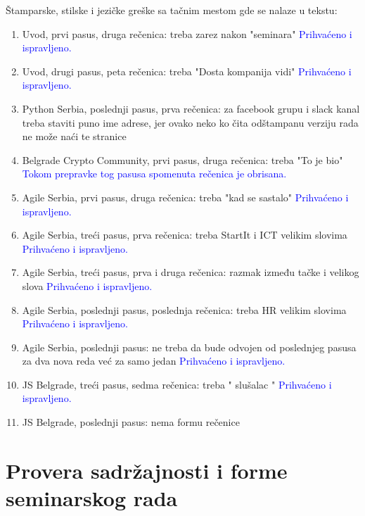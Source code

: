 \documentclass[a4paper]{report}
\newcommand{\odgovor}[1]{\textcolor{blue}{#1}}
\begin{document}
Štamparske, stilske i jezičke greške sa tačnim mestom gde se nalaze u tekstu:
\begin{enumerate}
\item Uvod, prvi pasus, druga rečenica: treba zarez nakon "{seminara}"
\odgovor{Prihvaćeno i ispravljeno.}
\item Uvod, drugi pasus, peta rečenica: treba "{Dosta kompanija vidi}"
\odgovor{Prihvaćeno i ispravljeno.}
\item Python Serbia, poslednji pasus, prva rečenica: za facebook grupu i slack kanal treba staviti puno ime adrese, jer ovako neko ko čita odštampanu verziju rada ne može naći te stranice
\item Belgrade Crypto Community, prvi pasus, druga rečenica: treba "To je bio"
\odgovor{Tokom prepravke tog pasusa spomenuta rečenica je obrisana.}
\item Agile Serbia, prvi pasus, druga rečenica: treba "kad se sastalo"
\odgovor{Prihvaćeno i ispravljeno.}
\item Agile Serbia, treći pasus, prva rečenica: treba StartIt i ICT velikim slovima
\odgovor{Prihvaćeno i ispravljeno.}
\item Agile Serbia, treći pasus, prva i druga rečenica: razmak između tačke i velikog slova
\odgovor{Prihvaćeno i ispravljeno.}
\item Agile Serbia, poslednji pasus, poslednja rečenica: treba HR velikim slovima
\odgovor{Prihvaćeno i ispravljeno.}
\item Agile Serbia, poslednji pasus: ne treba da bude odvojen od poslednjeg pasusa za dva nova reda već za samo jedan
\odgovor{Prihvaćeno i ispravljeno.}
\item JS Belgrade, treći pasus, sedma rečenica: treba " slušalac "
\odgovor{Prihvaćeno i ispravljeno.}
\item JS Belgrade, poslednji pasus: nema formu rečenice
\odgovor{} %
\end{enumerate}


\section{Provera sadržajnosti i forme seminarskog rada}
\end{document}
